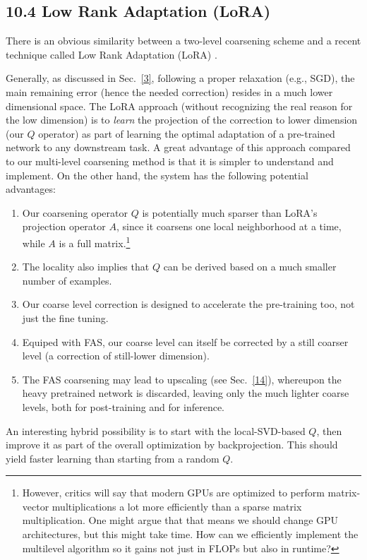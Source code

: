 \documentclass{article} %
\begin{document}
\subsection{10.4 Low Rank Adaptation (LoRA)}
There is an obvious similarity between a two-level coarsening scheme and a recent technique called Low Rank Adaptation (LoRA) \cite{lora}.

Generally, as discussed in Sec.~\ref{3}, following a proper relaxation (e.g., SGD), the main remaining error (hence the needed correction) resides in a much lower dimensional space. The LoRA approach (without recognizing the real reason for the low dimension) is to {\it learn} the projection of the correction to lower dimension (our $Q$ operator) as part of learning the optimal adaptation of a pre-trained network to any downstream task. A great advantage of this approach compared to our multi-level coarsening method is that it is simpler to understand and implement. On the other hand, the system has the following potential advantages:

\begin{enumerate}
    \item Our coarsening operator $Q$ is potentially much sparser than LoRA's projection operator $A$, since it coarsens one local neighborhood at a time, while $A$ is a full matrix.\footnote{However, critics will say that modern GPUs are optimized to perform matrix-vector multiplications a lot more efficiently than a sparse matrix multiplication. One might argue that that means we should change GPU architectures, but this might take time. How can we efficiently implement the multilevel algorithm so it gains not just in FLOPs but also in runtime?}
    \item The locality also implies that $Q$ can be derived based on a much smaller number of examples.
    \item Our coarse level correction is designed to accelerate the pre-training too, not just the fine tuning.
    \item Equiped with FAS, our coarse level can itself be corrected by a still coarser level (a correction of still-lower dimension).
    \item The FAS coarsening may lead to upscaling (see Sec.~\ref{14}), whereupon the heavy pretrained network is discarded, leaving only the much lighter coarse levels, both for post-training and for inference.
\end{enumerate}

An interesting hybrid possibility is to start with the local-SVD-based $Q$, then improve it as part of the overall optimization by backprojection. This should yield faster learning than starting from a random $Q$.
\end{document}
